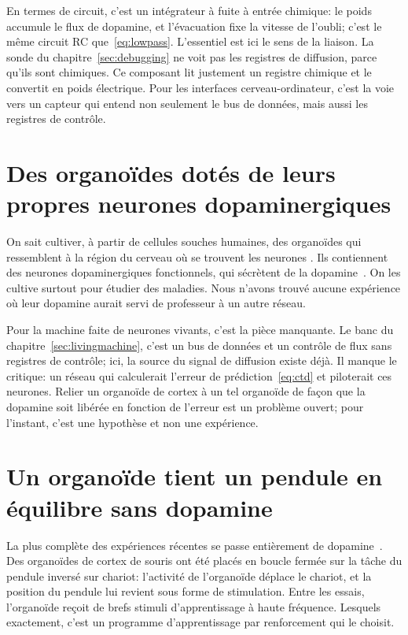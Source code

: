 En termes de circuit, c'est un intégrateur à fuite à entrée chimique: le poids accumule le flux de dopamine, et l'\og évacuation\fg{} fixe la vitesse de l'oubli; c'est le même circuit RC que~\eqref{eq:lowpass}. L'essentiel est ici le sens de la liaison. La sonde du chapitre~\ref{sec:debugging} ne voit pas les registres de diffusion, parce qu'ils sont chimiques. Ce composant lit justement un registre chimique et le convertit en poids électrique. Pour les interfaces cerveau-ordinateur, c'est la voie vers un capteur qui entend non seulement le bus de données, mais aussi les registres de contrôle.

\section{Des organoïdes dotés de leurs propres neurones dopaminergiques}
\label{sec:midbrainorg}

On sait cultiver, à partir de cellules souches humaines, des organoïdes qui ressemblent à la région du cerveau où se trouvent les neurones . Ils contiennent des neurones dopaminergiques fonctionnels, qui sécrètent de la dopamine~\cite{Jo2016}. On les cultive surtout pour étudier des maladies. Nous n'avons trouvé aucune expérience où leur dopamine aurait servi de professeur à un autre réseau.

Pour la machine faite de neurones vivants, c'est la pièce manquante. Le banc du chapitre~\ref{sec:livingmachine}, c'est un bus de données et un contrôle de flux sans registres de contrôle; ici, la source du signal de diffusion existe déjà. Il manque le critique: un réseau qui calculerait l'erreur de prédiction~\eqref{eq:ctd} et piloterait ces neurones. Relier un organoïde de cortex à un tel organoïde de façon que la dopamine soit libérée en fonction de l'erreur est un problème ouvert; pour l'instant, c'est une hypothèse et non une expérience.

\section{Un organoïde tient un pendule en équilibre sans dopamine}
\label{sec:cartpole}

La plus complète des expériences récentes se passe entièrement de dopamine~\cite{Robbins2026}. Des organoïdes de cortex de souris ont été placés en boucle fermée sur la tâche du \og pendule inversé sur chariot\fg{}: l'activité de l'organoïde déplace le chariot, et la position du pendule lui revient sous forme de stimulation. Entre les essais, l'organoïde reçoit de brefs stimuli d'apprentissage à haute fréquence. Lesquels exactement, c'est un programme d'apprentissage par renforcement qui le choisit.

